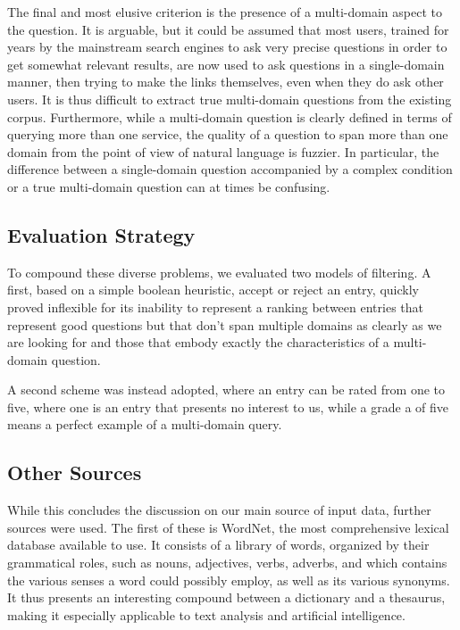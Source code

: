 The final and most elusive criterion is the presence of a multi-domain aspect to the question. It is arguable, but it could be assumed that most users, trained for years by the mainstream search engines to ask very precise questions in order to get somewhat relevant results, are now used to ask questions in a single-domain manner, then trying to make the links themselves, even when they do ask other users. It is thus difficult to extract true multi-domain questions from the existing corpus. Furthermore, while a multi-domain question is clearly defined in terms of querying more than one service, the quality of a question to span more than one domain from the point of view of natural language is fuzzier. In particular, the difference between a single-domain question accompanied by a complex condition or a true multi-domain question can at times be confusing.


\subsection{Evaluation Strategy} %
\label{sub:evaluation_strategy}

To compound these diverse problems, we evaluated two models of filtering. A first, based on a simple boolean heuristic, accept or reject an entry, quickly proved inflexible for its inability to represent a ranking between entries that represent good questions but that don't span multiple domains as clearly as we are looking for and those that embody exactly the characteristics of a multi-domain question.

A second scheme was instead adopted, where an entry can be rated from one to five, where one is an entry that presents no interest to us, while a grade a of five means a perfect example of a multi-domain query.


\subsection{Other Sources} %
\label{sub:other_sources}

While this concludes the discussion on our main source of input data, further sources were used. The first of these is WordNet\cite{Miller90wordnet:an}, the most comprehensive lexical database available to use. It consists of a library of words, organized by their grammatical roles, such as nouns, adjectives, verbs, adverbs, and which contains the various senses a word could possibly employ, as well as its various synonyms. It thus presents an interesting compound between a dictionary and a thesaurus, making it especially applicable to text analysis and artificial intelligence.

